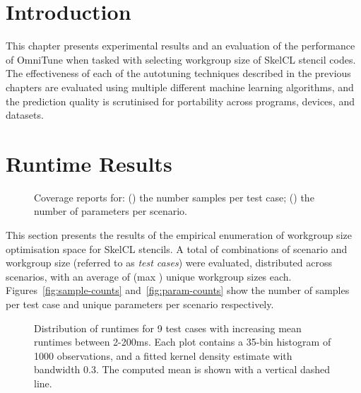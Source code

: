 \section{Introduction}

This chapter presents experimental results and an evaluation of the
performance of OmniTune when tasked with selecting workgroup size of
SkelCL stencil codes. The effectiveness of each of the autotuning
techniques described in the previous chapters are evaluated using
multiple different machine learning algorithms, and the prediction
quality is scrutinised for portability across programs, devices, and
datasets.


%


\section{Runtime Results}


\begin{figure}
  
  \caption{%
    Coverage reports for: () the number
    samples per test case; () the number of
    parameters per scenario.%
  }
\label{fig:num-samples}
\end{figure}


This section presents the results of the empirical enumeration of
workgroup size optimisation space for SkelCL stencils. A total of
 combinations of scenario and workgroup
size (referred to as \emph{test cases}) were evaluated, distributed
across  scenarios, with an average of
 (max ) unique
workgroup sizes each. Figures~\ref{fig:sample-counts}
and~\ref{fig:param-counts} show the number of samples per test case
and unique parameters per scenario respectively.


\begin{figure}

\caption{%
  Distribution of runtimes for 9 test cases with increasing mean
  runtimes between 2-200ms. Each plot contains a 35-bin histogram of
  1000 observations, and a fitted kernel density estimate with
  bandwidth 0.3. The computed mean is shown with a vertical dashed
  line. %
}
\label{fig:runtime-histograms}
\end{figure}


